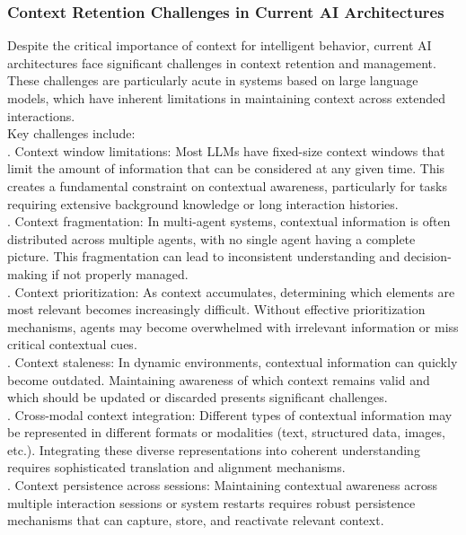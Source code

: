 \subsubsection{Context Retention Challenges in Current AI Architectures}
Despite the critical importance of context for intelligent behavior, current AI architectures face significant challenges in context retention and management. These challenges are particularly acute in systems based on large language models, which have inherent limitations in maintaining context across extended interactions.\\ \newline
Key challenges include:\\ . Context window limitations: Most LLMs have fixed-size context windows that limit the amount of information that can be considered at any given time. This creates a fundamental constraint on contextual awareness, particularly for tasks requiring extensive background knowledge or long interaction histories.\\ . Context fragmentation: In multi-agent systems, contextual information is often distributed across multiple agents, with no single agent having a complete picture. This fragmentation can lead to inconsistent understanding and decision-making if not properly managed.\\ . Context prioritization: As context accumulates, determining which elements are most relevant becomes increasingly difficult. Without effective prioritization mechanisms, agents may become overwhelmed with irrelevant information or miss critical contextual cues.\\ . Context staleness: In dynamic environments, contextual information can quickly become outdated. Maintaining awareness of which context remains valid and which should be updated or discarded presents significant challenges.\\ . Cross-modal context integration: Different types of contextual information may be represented in different formats or modalities (text, structured data, images, etc.). Integrating these diverse representations into coherent understanding requires sophisticated translation and alignment mechanisms.\\ . Context persistence across sessions: Maintaining contextual awareness across multiple interaction sessions or system restarts requires robust persistence mechanisms that can capture, store, and reactivate relevant context.\\ \newline
